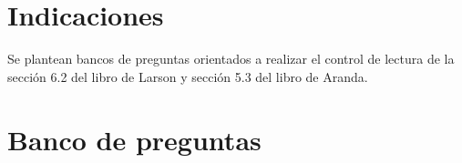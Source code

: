 \documentclass[a4,11pt]{aleph-notas}
\begin{document}
\encabezado

\vspace*{-8mm}
\tableofcontents

\section{Indicaciones}

Se plantean bancos de preguntas orientados a realizar el control de lectura de la sección 6.2 del libro de Larson y sección 5.3 del libro de Aranda.

\section{Banco de preguntas}
\end{document}
